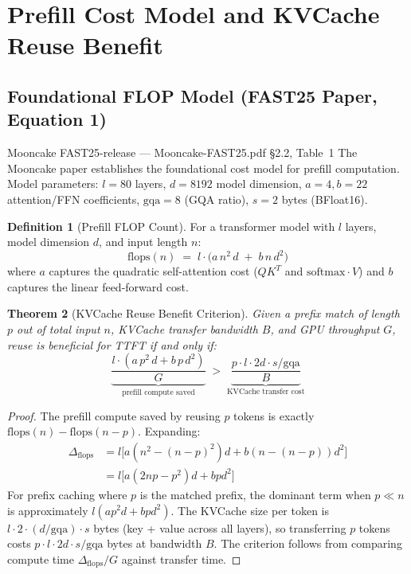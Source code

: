 \documentclass[11pt,a4paper,twoside]{article}
\theoremstyle{plain}
\newtheorem{theorem}{Theorem}[section]
\theoremstyle{definition}
\newtheorem{definition}[theorem]{Definition}
\theoremstyle{remark}
\begin{document}
\section{Prefill Cost Model and KVCache Reuse Benefit}
\label{sec:prefill-cost}

\subsection{Foundational FLOP Model (FAST25 Paper, Equation 1)}

\begin{commitbox}{Mooncake FAST25-release --- Mooncake-FAST25.pdf \S2.2, Table~1}
The Mooncake paper establishes the foundational cost model for prefill computation.
Model parameters: $l=80$ layers, $d=8192$ model dimension, $a=4,b=22$ attention/FFN
coefficients, $\text{gqa}=8$ (GQA ratio), $s=2$ bytes (BFloat16).
\end{commitbox}

\begin{definition}[Prefill FLOP Count]
\label{def:prefill-flops}
For a transformer model with $l$ layers, model dimension $d$, and input length $n$:
\begin{equation}
  \mathrm{flops}(n) \;=\; l \cdot \bigl(a\,n^2\,d \;+\; b\,n\,d^2\bigr)
  \label{eq:prefill-flops}
\end{equation}
where $a$ captures the quadratic self-attention cost ($Q K^T$ and $\mathrm{softmax} \cdot V$)
and $b$ captures the linear feed-forward cost.
\end{definition}

\begin{theorem}[KVCache Reuse Benefit Criterion]
\label{thm:kv-reuse}
Given a prefix match of length $p$ out of total input $n$, KVCache transfer bandwidth $B$,
and GPU throughput $G$, reuse is beneficial for TTFT if and only if:
\begin{equation}
  \underbrace{\frac{l \cdot (a\,p^2\,d + b\,p\,d^2)}{G}}_{\text{prefill compute saved}}
  \;>\;
  \underbrace{\frac{p \cdot l \cdot 2d \cdot s / \text{gqa}}{B}}_{\text{KVCache transfer cost}}
  \label{eq:kv-reuse-criterion}
\end{equation}
\end{theorem}

\begin{proof}
The prefill compute saved by reusing $p$ tokens is exactly
$\mathrm{flops}(n) - \mathrm{flops}(n-p)$.  Expanding:
\begin{align*}
  \Delta_{\text{flops}} &= l\bigl[a(n^2 - (n-p)^2)d + b(n-(n-p))d^2\bigr]\\
  &= l\bigl[a(2np - p^2)d + bpd^2\bigr]
\end{align*}
For prefix caching where $p$ is the matched prefix, the dominant term when $p \ll n$ is
approximately $l(ap^2 d + bpd^2)$.  The KVCache size per token is
$l \cdot 2 \cdot (d/\text{gqa}) \cdot s$ bytes (key + value across all layers), so transferring
$p$ tokens costs $p \cdot l \cdot 2d \cdot s / \text{gqa}$ bytes at bandwidth $B$.
The criterion follows from comparing compute time $\Delta_{\text{flops}}/G$ against
transfer time.
\end{proof}
\end{document}
